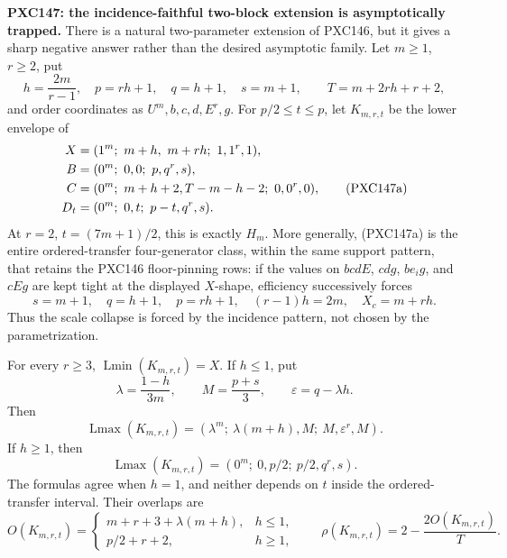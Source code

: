 \documentclass[11pt]{article}
\newcommand{\Lmin}{\operatorname{Lmin}}
\newcommand{\Lmax}{\operatorname{Lmax}}
\begin{document}
\medskip
\noindent\textbf{PXC147: the incidence-faithful two-block extension is
asymptotically trapped.}
There is a natural two-parameter extension of PXC146, but it gives a sharp
negative answer rather than the desired asymptotic family.  Let \(m\ge1\),
\(r\ge2\), put
\[
 h=\frac{2m}{r-1},\quad p=rh+1,\quad q=h+1,\quad s=m+1,
 \qquad T=m+2rh+r+2,
\]
and order coordinates as \(U^m,b,c,d,E^r,g\).  For \(p/2\le t\le p\),
let \(K_{m,r,t}\) be the lower envelope of
\begin{align}
 X&=(1^m;\ m+h,\ m+rh;\ 1,1^r,1),\notag\\
 B&=(0^m;\ 0,0;\ p,q^r,s),\notag\\
 C&=(0^m;\ m+h+2,T-m-h-2;\ 0,0^r,0),\tag{PXC147a}\\
 D_t&=(0^m;\ 0,t;\ p-t,q^r,s).\notag
\end{align}
At \(r=2\), \(t=(7m+1)/2\), this is exactly \(H_m\).  More generally,
(PXC147a) is the entire ordered-transfer four-generator class, within the
same support pattern, that retains the PXC146 floor-pinning rows: if the
values on \(bcdE\), \(cdg\), \(be_i g\), and \(cEg\) are kept tight at the
displayed \(X\)-shape, efficiency successively forces
\[
 s=m+1,\quad q=h+1,\quad p=rh+1,\quad
 (r-1)h=2m,\quad X_c=m+rh.                         \tag{PXC147b}
\]
Thus the scale collapse is forced by the incidence pattern, not chosen by
the parametrization.

For every \(r\ge3\), \(\Lmin(K_{m,r,t})=X\).  If \(h\le1\), put
\[
 \lambda=\frac{1-h}{3m},\qquad M=\frac{p+s}{3},\qquad
 \varepsilon=q-\lambda h.
\]
Then
\begin{equation}
 \Lmax(K_{m,r,t})=
 (\lambda^m;\ \lambda(m+h),M;\ M,\varepsilon^r,M).       \tag{PXC147c}
\end{equation}
If \(h\ge1\), then
\begin{equation}
 \Lmax(K_{m,r,t})=(0^m;\ 0,p/2;\ p/2,q^r,s).              \tag{PXC147d}
\end{equation}
The formulas agree when \(h=1\), and neither depends on \(t\) inside the
ordered-transfer interval.  Their overlaps are
\begin{equation}
 O(K_{m,r,t})=
 \begin{cases}
 m+r+3+\lambda(m+h),&h\le1,\\
 p/2+r+2,&h\ge1,
 \end{cases}
 \qquad
 \rho(K_{m,r,t})=2-\frac{2O(K_{m,r,t})}{T}.               \tag{PXC147e}
\end{equation}
\end{document}
